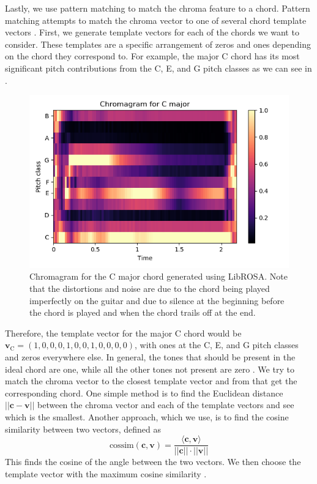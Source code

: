 \documentclass[journal]{IEEEtran}
\begin{document}
Lastly, we use pattern matching to match the chroma feature to a chord.
Pattern matching attempts to match the chroma vector to one of several chord template vectors \cite{fujishima}.
First, we generate template vectors for each of the chords we want to consider.
These templates are a specific arrangement of zeros and ones depending on the chord they correspond to.
For example, the major C chord has its most significant pitch contributions from the C, E, and G pitch classes as we can see in .
\begin{figure}[t]
    \centering
    \includegraphics[width = \linewidth]{../Figures/chromagram_c_major}
    \caption{Chromagram for the C major chord generated using LibROSA.
    Note that the distortions and noise are due to the chord being played imperfectly on the guitar and due to silence at the beginning before the chord is played and when the chord trails off at the end.}
    \label{fig:chroma}
\end{figure}
Therefore, the template vector for the major C chord would be $\mathbf{v}_{\text{C}} = (1, 0, 0, 0, 1, 0, 0, 1, 0, 0, 0, 0)$, with ones at the C, E, and G pitch classes and zeros everywhere else.
In general, the tones that should be present in the ideal chord are one, while all the other tones not present are zero \cite{cho_chroma}.
We try to match the chroma vector to the closest template vector and from that get the corresponding chord.
One simple method is to find the Euclidean distance $||\mathbf{c} - \mathbf{v}||$ between the chroma vector and each of the template vectors and see which is the smallest.
Another approach, which we use, is to find the cosine similarity between two vectors, defined as 
\begin{equation}
    \text{cossim}(\mathbf{c}, \mathbf{v}) = \frac{\langle\mathbf{c}, \mathbf{v}\rangle}{||\mathbf{c}|| \cdot ||\mathbf{v}||}
    \label{eq:cossim}
\end{equation}
This finds the cosine of the angle between the two vectors.
We then choose the template vector with the maximum cosine similarity \cite{jiang}.
\end{document}
